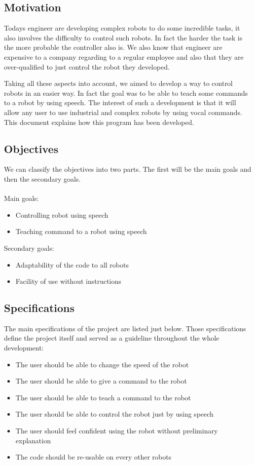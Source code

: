 \subsection{Motivation}
Todays engineer are developing complex robots to do some incredible tasks, it also involves the difficulty to control such robots. In fact the harder the task is the more probable the controller also is. We also know that engineer are expensive to a company regarding to a regular employee and also that they are over-qualified to just control the robot they developed.

Taking all these aspects into account, we aimed to develop a way to control robots in an easier way. In fact the goal was to be able to teach some commands to a robot by using speech. The interest of such a development is that it will allow any user to use industrial and complex robots by using vocal commands. This document explains how this program has been developed.

\subsection{Objectives}

We can classify the objectives into two parts. The first will be the main goals and then the secondary goals.\\
\\Main goals:
\begin{itemize}
  \item Controlling robot using speech
  \item Teaching command to a robot using speech
\end{itemize}
Secondary goals:
\begin{itemize}
  \item Adaptability of the code to all robots
  \item Facility of use without instructions
\end{itemize}

\subsection{Specifications}
\hfill \linebreak
The main specifications of the project are listed just below. Those specifications define the project itself and served as a guideline throughout the whole development: 
\begin{itemize}
  \item The user should be able to change the speed of the robot 
  \item The user should be able to give a command to the robot 
  \item The user should be able to teach a command to the robot
  \item The user should be able to control the robot just by using speech 
  \item The user should feel confident using the robot without preliminary explanation 
  \item The code should be re-usable on every other robots 
\end{itemize}

